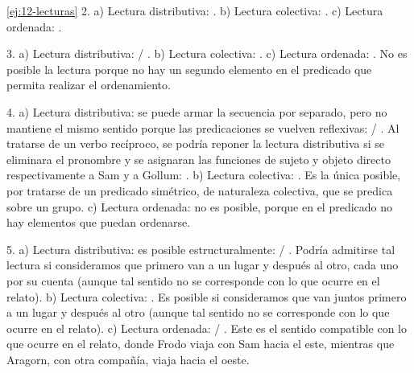 \begin{solucion}{\ref{ej:12-lecturas}}
2. a) Lectura distributiva: . b) Lectura colectiva:
. c) Lectura
ordenada: .

3. a) Lectura distributiva:  / . b) Lectura
colectiva: . c) Lectura ordenada:
. No es posible
la lectura porque no hay un segundo elemento en el predicado que permita
realizar el ordenamiento.

4. a) Lectura distributiva: se puede armar la secuencia por separado, pero no
mantiene el mismo sentido porque las predicaciones se vuelven reflexivas:
 /
. Al tratarse de un verbo
recíproco, se podría reponer la lectura distributiva si se eliminara el pronombre
 y se asignaran las funciones de sujeto y objeto directo
respectivamente a Sam y a Gollum: .
b) Lectura colectiva: . Es la
única posible, por tratarse de un predicado simétrico, de naturaleza colectiva,
que se predica sobre un grupo. c) Lectura ordenada: no es posible, porque en el
predicado no hay elementos que puedan ordenarse.

5. a) Lectura distributiva: es posible estructuralmente:  / . Podría admitirse tal
lectura si consideramos que primero van a un lugar y después al otro, cada uno
por su cuenta (aunque tal sentido no se corresponde con lo que ocurre en el
relato). b) Lectura colectiva: . Es posible si consideramos que van juntos primero a un
lugar y después al otro (aunque tal sentido no se corresponde con lo que ocurre
en el relato). c) Lectura ordenada:  / . Este es el sentido compatible con lo
que ocurre en el relato, donde Frodo viaja con Sam hacia el este, mientras que
Aragorn, con otra compañía, viaja hacia el oeste.
\end{solucion}

